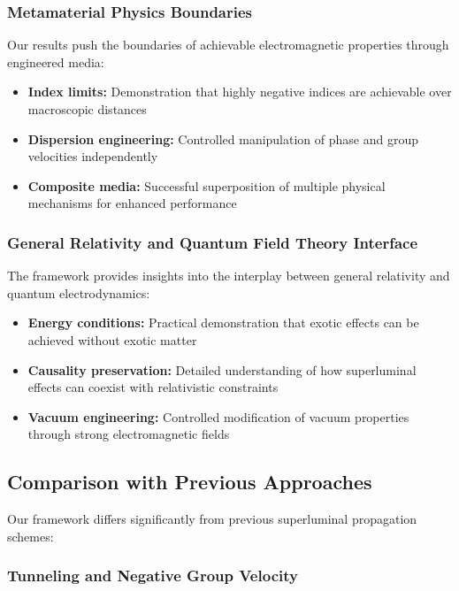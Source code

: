 \documentclass[aps,prl,reprint,groupedaddress,floatfix]{revtex4-1}
\begin{document}
\subsubsection{Metamaterial Physics Boundaries}

Our results push the boundaries of achievable electromagnetic properties through engineered media:
\begin{itemize}
    \item \textbf{Index limits:} Demonstration that highly negative indices are achievable over macroscopic distances
    \item \textbf{Dispersion engineering:} Controlled manipulation of phase and group velocities independently
    \item \textbf{Composite media:} Successful superposition of multiple physical mechanisms for enhanced performance
\end{itemize}

\subsubsection{General Relativity and Quantum Field Theory Interface}

The framework provides insights into the interplay between general relativity and quantum electrodynamics:
\begin{itemize}
    \item \textbf{Energy conditions:} Practical demonstration that exotic effects can be achieved without exotic matter
    \item \textbf{Causality preservation:} Detailed understanding of how superluminal effects can coexist with relativistic constraints
    \item \textbf{Vacuum engineering:} Controlled modification of vacuum properties through strong electromagnetic fields
\end{itemize}

\subsection{Comparison with Previous Approaches}

Our framework differs significantly from previous superluminal propagation schemes:

\subsubsection{Tunneling and Negative Group Velocity}
\end{document}
